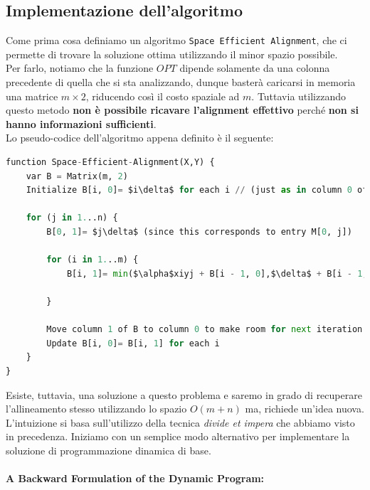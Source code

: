 \subsection{Implementazione dell'algoritmo}

Come prima cosa definiamo un algoritmo
\texttt{Space\ Efficient\ Alignment}, che ci permette di trovare la
soluzione ottima utilizzando il minor spazio possibile.\\ Per farlo,
notiamo che la funzione $OPT$ dipende solamente da una colonna
precedente di quella che si sta analizzando, dunque basterà caricarsi in
memoria una matrice $m \times 2$, riducendo così il costo spaziale ad
$m$. Tuttavia utilizzando questo metodo \textbf{non è possibile
  ricavare l'alignment effettivo} perché \textbf{non si hanno informazioni
  sufficienti}.\\

Lo pseudo-codice dell'algoritmo appena definito è il seguente:

\begin{lstlisting}[language=Python, mathescape=true]
function Space-Efficient-Alignment(X,Y) {
    var B = Matrix(m, 2)
    Initialize B[i, 0]= $i\delta$ for each i // (just as in column 0 of M)

    for (j in 1...n) {
        B[0, 1]= $j\delta$ (since this corresponds to entry M[0, j])

        for (i in 1...m) {
            B[i, 1]= min($\alpha$xiyj + B[i - 1, 0],$\delta$ + B[i - 1, 1], $\delta$ + B[i, 0])

        }

        Move column 1 of B to column 0 to make room for next iteration:
        Update B[i, 0]= B[i, 1] for each i
    }
}
\end{lstlisting}

Esiste, tuttavia, una soluzione a questo problema e saremo in grado di
recuperare l'allineamento stesso utilizzando lo spazio $O(m + n)$ ma,
richiede un'idea nuova. L'intuizione si basa sull'utilizzo della tecnica
\emph{divide et impera} che abbiamo visto in precedenza. Iniziamo con un
semplice modo alternativo per implementare la soluzione di
programmazione dinamica di base.

\paragraph{A Backward Formulation of the Dynamic Program:}\

